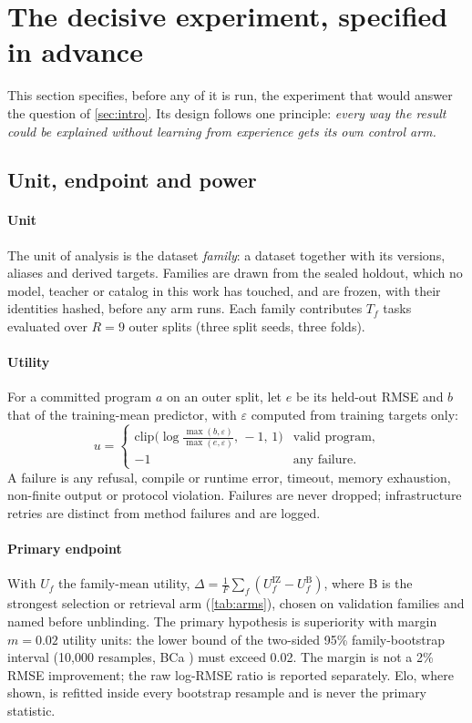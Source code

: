 \section{The decisive experiment, specified in advance}
\label{sec:protocol}

This section specifies, before any of it is run, the experiment that would answer the question of
\cref{sec:intro}. Its design follows one principle: \emph{every way the result could be explained
without learning from experience gets its own control arm.}

\subsection{Unit, endpoint and power}

\paragraph{Unit} The unit of analysis is the dataset \emph{family}: a dataset together with its
versions, aliases and derived targets. Families are drawn from the sealed holdout, which no model,
teacher or catalog in this work has touched, and are frozen, with their identities hashed, before
any arm runs. Each family contributes $T_f$ tasks evaluated over $R=9$ outer splits (three split
seeds, three folds).

\paragraph{Utility} For a committed program $a$ on an outer split, let $e$ be its held-out RMSE and
$b$ that of the training-mean predictor, with $\varepsilon$ computed from training targets only:
\begin{equation}
u = \begin{cases} \mathrm{clip}\bigl(\log\frac{\max(b,\varepsilon)}{\max(e,\varepsilon)},\,-1,\,1\bigr) & \text{valid program,}\\
-1 & \text{any failure.}\end{cases}
\label{eq:utility}
\end{equation}
A failure is any refusal, compile or runtime error, timeout, memory exhaustion, non-finite output or
protocol violation. Failures are never dropped; infrastructure retries are distinct from method
failures and are logged.

\paragraph{Primary endpoint} With $U_{f}$ the family-mean utility,
$\Delta = \tfrac1F\sum_f (U_f^{\mathrm{IZ}} - U_f^{\mathrm{B}})$, where B is the strongest
selection or retrieval arm (\cref{tab:arms}), chosen on validation families and named before
unblinding. The primary hypothesis is superiority with margin $m=0.02$ utility units: the lower bound
of the two-sided 95\% family-bootstrap interval (10,000 resamples, BCa \citep{efron1987bca}) must
exceed 0.02. The margin is not a 2\% RMSE improvement; the raw log-RMSE ratio is reported
separately. Elo, where shown, is refitted inside every bootstrap resample and is never the primary
statistic.


